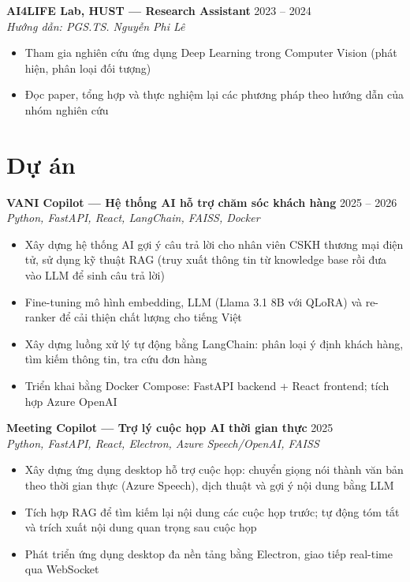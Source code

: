 \documentclass[a4paper,10pt]{article}
\begin{document}
\vspace{3pt}

\textbf{AI4LIFE Lab, HUST --- Research Assistant} \hfill 2023 -- 2024\\
\textit{Hướng dẫn: PGS.TS. Nguyễn Phi Lê}
\begin{itemize}
  \item Tham gia nghiên cứu ứng dụng Deep Learning trong Computer Vision (phát hiện, phân loại đối tượng)
  \item Đọc paper, tổng hợp và thực nghiệm lại các phương pháp theo hướng dẫn của nhóm nghiên cứu
\end{itemize}

\section{Dự án}

\textbf{VANI Copilot --- Hệ thống AI hỗ trợ chăm sóc khách hàng} \hfill 2025 -- 2026\\
\textit{Python, FastAPI, React, LangChain, FAISS, Docker}
\begin{itemize}
  \item Xây dựng hệ thống AI gợi ý câu trả lời cho nhân viên CSKH thương mại điện tử, sử dụng kỹ thuật RAG (truy xuất thông tin từ knowledge base rồi đưa vào LLM để sinh câu trả lời)
  \item Fine-tuning mô hình embedding, LLM (Llama 3.1 8B với QLoRA) và re-ranker để cải thiện chất lượng cho tiếng Việt
  \item Xây dựng luồng xử lý tự động bằng LangChain: phân loại ý định khách hàng, tìm kiếm thông tin, tra cứu đơn hàng
  \item Triển khai bằng Docker Compose: FastAPI backend + React frontend; tích hợp Azure OpenAI
\end{itemize}

\vspace{3pt}

\textbf{Meeting Copilot --- Trợ lý cuộc họp AI thời gian thực} \hfill 2025\\
\textit{Python, FastAPI, React, Electron, Azure Speech/OpenAI, FAISS}
\begin{itemize}
  \item Xây dựng ứng dụng desktop hỗ trợ cuộc họp: chuyển giọng nói thành văn bản theo thời gian thực (Azure Speech), dịch thuật và gợi ý nội dung bằng LLM
  \item Tích hợp RAG để tìm kiếm lại nội dung các cuộc họp trước; tự động tóm tắt và trích xuất nội dung quan trọng sau cuộc họp
  \item Phát triển ứng dụng desktop đa nền tảng bằng Electron, giao tiếp real-time qua WebSocket
\end{itemize}
\end{document}
